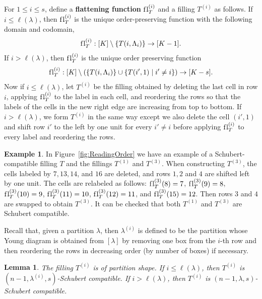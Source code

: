 \documentclass[11pt]{amsart}
\newtheorem{lemma}[theorem]{Lemma}     %
\theoremstyle{definition}
\newtheorem{example}[theorem]{Example}
\newcommand{\fl}{\mathrm{f\hspace{0.25pt}l}}
\begin{document}
For $1\leq i \leq s$, define a {\bf flattening function} $\fl_T^{(i)}$ 
and a filling $T^{(i)}$ as follows.
If $i\leq \ell(\lambda)$, then $\fl_T^{(i)}$ is the unique order-preserving function with the following domain and codomain,
\begin{align}
    \fl_T^{(i)} : [K]\setminus\{ T(i,\Lambda_i) \} \to [K-1].
\end{align}
If $i> \ell(\lambda)$, then $\fl_T^{(i)}$ is the unique order preserving function
\begin{align}
    \fl_T^{(i)}: [K]\setminus(\{T(i,\Lambda_i)\}\cup \{T(i',1)\mid i'\neq i\}) \to [K-s].
\end{align}
Now if $i\leq \ell(\lambda)$, let $T^{(i)}$ be the filling obtained by deleting the last cell in row $i$, applying $\fl_T^{(i)}$ to the label in each cell, and reordering the rows so that the labels of the cells in the new right edge are increasing from top to bottom.
If $i>\ell(\lambda)$, we form $T^{(i)}$ in the same way except we also delete the cell $(i',1)$ and shift row $i'$ to the left by one unit for every $i'\neq i$ before applying $\fl_T^{(i)}$ to every label and reordering the rows.

\begin{example}
In Figure~\ref{fig:ReadingOrder} we have an example of a Schubert-compatible filling $T$ and the fillings $T^{(1)}$ and $T^{(3)}$. When constructing $T^{(3)}$, the cells labeled by $7,13,14$, and $16$ are deleted, and rows $1,2$ and $4$ are shifted left by one unit. The cells are relabeled as follows: $\fl_T^{(3)}(8)=7$, $\fl_T^{(3)}(9) = 8$, $\fl_T^{(3)}(10) = 9$, $\fl_T^{(3)}(11)=10$, $\fl_T^{(3)}(12) = 11$, and $\fl_T^{(3)}(15)=12$. Then rows $3$ and $4$ are swapped to obtain $T^{(3)}$. It can be checked that both $T^{(1)}$ and $T^{(3)}$ are Schubert compatible.
\end{example}

Recall that, given a partition $\lambda$, then $\lambda^{(i)}$ is defined to be the partition whose Young diagram is obtained from $[\lambda]$ by removing one box from the $i$-th row and then reordering the rows in decreasing order (by number of boxes) if necessary.

\begin{lemma}
The filling $T^{(i)}$ is of partition shape.  If $i \leq \ell(\lambda)$, then $T^{(i)}$ is $(n-1,\lambda^{(i)},s)$-Schubert compatible. If $i > \ell(\lambda)$, then $T^{(i)}$ is $(n-1,\lambda,s)$-Schubert compatible.
\end{lemma}
\end{document}
